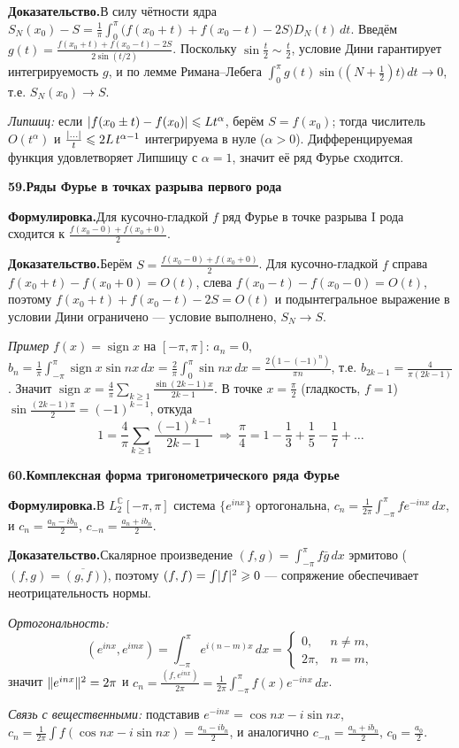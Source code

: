 \documentclass[10pt,a4paper]{article}
\DeclareMathOperator{\sign}{sign}
\newcommand{\C}{\mathbb{C}}
\newcommand{\dx}{\,dx}
\newcommand{\dt}{\,dt}
\renewcommand{\le}{\leqslant}
\renewcommand{\ge}{\geqslant}
\DeclarePairedDelimiter{\abs}{\lvert}{\rvert}
\DeclarePairedDelimiter{\norm}{\lVert}{\rVert}
\theoremstyle{definition}
\theoremstyle{plain}
\newcommand{\writespace}{\vspace{7.5mm}}
\newcommand{\prf}[2]{%
  \par\writespace\noindent
  {\large\bfseries\color{accent}#1.\enspace #2}\par\smallskip}
\newcommand{\stmt}{\par\noindent\textbf{Формулировка.}\enspace}
\newcommand{\dok}{\par\noindent\textbf{Доказательство.}\enspace}
\begin{document}
\dok В силу чётности ядра
$S_N(x_0)-S=\tfrac1\pi\int_0^\pi\bigl(f(x_0+t)+f(x_0-t)-2S\bigr)D_N(t)\dt$. Введём
$g(t)=\tfrac{f(x_0+t)+f(x_0-t)-2S}{2\sin(t/2)}$. Поскольку $\sin\tfrac t2\sim\tfrac t2$, условие Дини
гарантирует интегрируемость $g$, и по лемме Римана–Лебега
$\int_0^\pi g(t)\sin\bigl((N+\tfrac12)t\bigr)\dt\to0$, т.е. $S_N(x_0)\to S$.

\emph{Липшиц:} если
$\abs{f(x_0\pm t)-f(x_0)}\le Lt^\alpha$, берём $S=f(x_0)$; тогда числитель $O(t^\alpha)$ и
$\tfrac{\abs{\dots}}{t}\le2L\,t^{\alpha-1}$ интегрируема в нуле ($\alpha>0$). Дифференцируемая
функция удовлетворяет Липшицу с $\alpha=1$, значит её ряд Фурье сходится.

\prf{59}{Ряды Фурье в точках разрыва первого рода}
\stmt Для кусочно-гладкой $f$ ряд Фурье в точке разрыва I рода сходится к
$\tfrac{f(x_0-0)+f(x_0+0)}{2}$.

\dok Берём $S=\tfrac{f(x_0-0)+f(x_0+0)}{2}$. Для кусочно-гладкой $f$ справа
$f(x_0+t)-f(x_0+0)=O(t)$, слева $f(x_0-t)-f(x_0-0)=O(t)$, поэтому $f(x_0+t)+f(x_0-t)-2S=O(t)$ и
подынтегральное выражение в условии Дини ограничено — условие выполнено, $S_N\to S$.

\emph{Пример} $f(x)=\sign x$ на $[-\pi,\pi]$: $a_n=0$,
$b_n=\tfrac1\pi\int_{-\pi}^\pi\sign x\sin nx\dx=\tfrac2\pi\int_0^\pi\sin nx\dx=\tfrac{2(1-(-1)^n)}{\pi n}$,
т.е. $b_{2k-1}=\tfrac{4}{\pi(2k-1)}$. Значит
$\sign x=\tfrac4\pi\sum_{k\ge1}\tfrac{\sin(2k-1)x}{2k-1}$. В точке $x=\tfrac\pi2$ (гладкость, $f=1$)
$\sin\tfrac{(2k-1)\pi}2=(-1)^{k-1}$, откуда
\[
  1=\frac4\pi\sum_{k\ge1}\frac{(-1)^{k-1}}{2k-1}\ \Rightarrow\
  \frac\pi4=1-\frac13+\frac15-\frac17+\dots
\]

\prf{60}{Комплексная форма тригонометрического ряда Фурье}
\stmt В $L_2^{\C}[-\pi,\pi]$ система $\{e^{inx}\}$ ортогональна, $c_n=\tfrac1{2\pi}\int_{-\pi}^\pi
f e^{-inx}\dx$, и $c_n=\tfrac{a_n-ib_n}{2}$, $c_{-n}=\tfrac{a_n+ib_n}{2}$.

\dok Скалярное произведение $(f,g)=\int_{-\pi}^\pi f\bar g\dx$ эрмитово ($(f,g)=\overline{(g,f)}$),
поэтому $(f,f)=\int\abs f^2\ge0$ — сопряжение обеспечивает неотрицательность нормы.

\emph{Ортогональность:}
\[
  (e^{inx},e^{imx})=\int_{-\pi}^\pi e^{i(n-m)x}\dx=
  \begin{cases}0,&n\ne m,\\ 2\pi,&n=m,\end{cases}
\]
значит $\norm{e^{inx}}^2=2\pi$ и $c_n=\tfrac{(f,e^{inx})}{2\pi}=\tfrac1{2\pi}\int_{-\pi}^\pi
f(x)e^{-inx}\dx$.

\emph{Связь с вещественными:} подставив $e^{-inx}=\cos nx-i\sin nx$,
$c_n=\tfrac1{2\pi}\int f(\cos nx-i\sin nx)=\tfrac{a_n-ib_n}{2}$, и аналогично
$c_{-n}=\tfrac{a_n+ib_n}{2}$, $c_0=\tfrac{a_0}{2}$.
\end{document}
